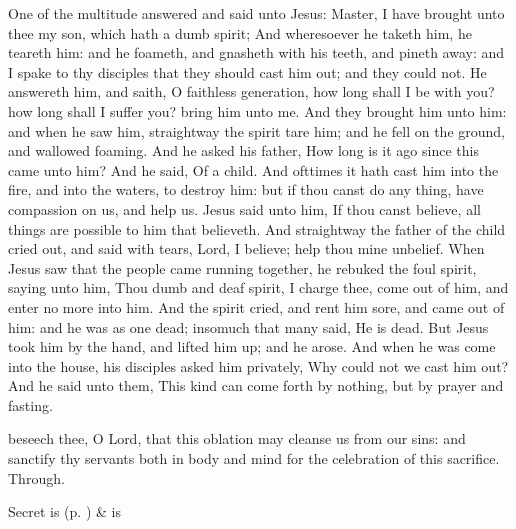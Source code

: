  One of the multitude answered and said unto Jesus: Master, I have brought unto thee my son, which hath a dumb spirit; And wheresoever he taketh him, he teareth him: and he foameth, and gnasheth with his teeth, and pineth away: and I spake to thy disciples that they should cast him out; and they could not. He answereth him, and saith, O faithless generation, how long shall I be with you? how long shall I suffer you? bring him unto me. And they brought him unto him: and when he saw him, straightway the spirit tare him; and he fell on the ground, and wallowed foaming. And he asked his father, How long is it ago since this came unto him? And he said, Of a child. And ofttimes it hath cast him into the fire, and into the waters, to destroy him: but if thou canst do any thing, have compassion on us, and help us. Jesus said unto him, If thou canst believe, all things are possible to him that believeth. And straightway the father of the child cried out, and said with tears, Lord, I believe; help thou mine unbelief. When Jesus saw that the people came running together, he rebuked the foul spirit, saying unto him, Thou dumb and deaf spirit, I charge thee, come out of him, and enter no more into him. And the spirit cried, and rent him sore, and came out of him: and he was as one dead; insomuch that many said, He is dead. But Jesus took him by the hand, and lifted him up; and he arose. And when he was come into the house, his disciples asked him privately, Why could not we cast him out? And he said unto them, This kind can come forth by nothing, but by prayer and fasting.


\clearpage
{}

\secret
{} beseech thee, O Lord, that this oblation may cleanse us from our sins: and sanctify thy servants both in body and mind for the celebration of this sacrifice. Through.
\begin{rubric}
     Secret is  (p. \pageref{SPSaints}) \&  is 
\end{rubric}


